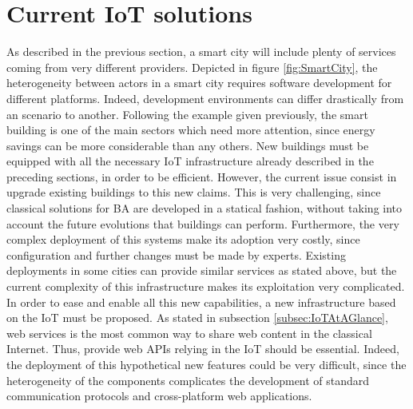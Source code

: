 \section{Current IoT solutions}
As described in the previous section, a smart city will include plenty of services coming from very different providers.
Depicted in figure \ref{fig:SmartCity}, the heterogeneity between actors in a smart city requires software development for different platforms.
Indeed, development environments can differ drastically from an scenario to another.
Following the example given previously, the smart building is one of the main sectors which need more attention, since energy savings can be more considerable than any others.
New buildings must be equipped with all the necessary IoT infrastructure already described in the preceding sections, in order to be efficient.
However, the current issue consist in upgrade existing buildings to this new claims.
This is very challenging, since classical solutions for BA are developed in a statical fashion, without taking into account the future evolutions that buildings can perform.
Furthermore, the very complex deployment of this systems make its adoption very costly, since configuration and further changes must be made by experts.
Existing deployments in some cities can provide similar services as stated above, but the current complexity of this infrastructure makes its exploitation very complicated.
In order to ease and enable all this new capabilities, a new infrastructure based on the IoT must be proposed.
As stated in subsection \ref{subsec:IoTAtAGlance}, web services is the most common way to share web content in the classical Internet.
Thus, provide web APIs relying in the IoT should be essential.
Indeed, the deployment of this hypothetical new features could be very difficult, since the heterogeneity of the components complicates the development of standard communication protocols and cross-platform web applications.




